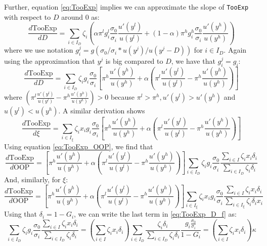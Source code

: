 \documentclass[a4paper,12pt]{article}
\begin{document}
Further, equation \eqref{eq:TooExp} implies we can approximate the slope of \texttt{TooExp} with respect to \(D\) around 0 as:
\begin{equation}
\label{eq:TooExp_D}
\frac{d \text{TooExp}}{d D} = \sum_{i \in I_D} \zeta_i \left( \alpha \pi^l g^l_i \frac{\sigma_{0}}{\sigma_{i}} \frac{u'(y^{l})}{u(y^{l})} + (1-\alpha) \pi^h g_i^h \frac{\sigma_{0}}{\sigma_{i}} \frac{u'(y^{h})}{u(y^h)}
\right)
\end{equation}
where we use notation \(g_{i}^j = g(\sigma_0/\sigma_i * u(y^j)/u(y^j-D))\) for \(i \in I_{D}\). Again using the approximation that \(y^{j}\) is big compared to \(D\), we have that \(g_i^j=g_i\):
\begin{equation}
\frac{d \text{TooExp}}{d D} = \sum_{i \in I_D} \zeta_i g_i \frac{\sigma_0}{\sigma_i} \left[ \pi^h \frac{u'(y^{h})}{u(y^h)} + \alpha \left( \pi^l \frac{u'(y^{l})}{u(y^l)}- \pi^h \frac{u'(y^{h})}{u(y^h)}  \right)
\right]
\end{equation}
where \(\left( \pi^l \frac{u'(y^{l})}{u(y^l)}- \pi^h \frac{u'(y^{h})}{u(y^h)}  \right) > 0\) because \(\pi^l > \pi^h, u'(y^{l}) > u'(y^h)\) and \(u(y^l) < u(y^h)\). A similar derivation shows
\begin{equation}
\frac{d \text{TooExp}}{d \xi} = \sum_{i \in I_\xi} \zeta_i x_i g_i \frac{\sigma_0}{\sigma_i} \left[ \pi^h \frac{u'(y^{h})}{u(y^h)} + \alpha \left( \pi^l \frac{u'(y^{l})}{u(y^l)}- \pi^h \frac{u'(y^{h})}{u(y^h)}  \right)
\right]
\end{equation}
Using equation \eqref{eq:TooExp_OOP}, we find that
\begin{equation}
\label{eq:TooExp_D_f}
\frac{d \text{TooExp}}{d \text{OOP}} =\left[ \pi^h \frac{u'(y^{h})}{u(y^h)} + \alpha \left( \pi^l \frac{u'(y^{l})}{u(y^l)}- \pi^h \frac{u'(y^{h})}{u(y^h)}  \right)
\right]  \sum_{i \in I_D} \zeta_i g_i \frac{\sigma_0}{\sigma_i}
\frac{\sum_{i \in I} \zeta_i x_i \delta_{i}}{\sum_{i \in I_D} \zeta_i \delta_i}
\end{equation}
And, similarly, for \(\xi\):
\begin{equation}
\frac{d \text{TooExp}}{d \text{OOP}} =\left[ \pi^h \frac{u'(y^{h})}{u(y^h)} + \alpha \left( \pi^l \frac{u'(y^{l})}{u(y^l)}- \pi^h \frac{u'(y^{h})}{u(y^h)}  \right)
\right]  \sum_{i \in I_\xi} \zeta_i x_{i} g_i \frac{\sigma_0}{\sigma_i}
\frac{\sum_{i \in I} \zeta_i x_i \delta_i}{\sum_{i \in I_\xi} \zeta_i \delta_i x_i}
\end{equation}
Using that \(\delta_i = 1-G_i\), we can write the last term in \eqref{eq:TooExp_D_f} as:
\begin{equation}
\sum_{i \in I_D} \zeta_i g_i \frac{\sigma_0}{\sigma_i}
\frac{\sum_{i \in I} \zeta_i x_i \delta_{i}}{\sum_{i \in I_D} \zeta_i \delta_i}
= \left(\sum_{i \in I} \zeta_i x_i \delta_i\right) \sum_{i \in I_{D}} \frac{\zeta_i \delta_i}{\sum_{i \in I_D} \zeta_i \delta_i} \frac{g_i \frac{\sigma_0}{\sigma_i}}{1-G_i} = \left(\sum_{i \in I} \zeta_i x_i \delta_i\right) \kappa
\end{equation}
\end{document}
